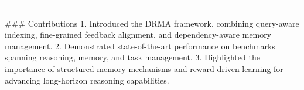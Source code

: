 ---

### Contributions
1. Introduced the DRMA framework, combining query-aware indexing, fine-grained feedback alignment, and dependency-aware memory management.
2. Demonstrated state-of-the-art performance on benchmarks spanning reasoning, memory, and task management.
3. Highlighted the importance of structured memory mechanisms and reward-driven learning for advancing long-horizon reasoning capabilities.

